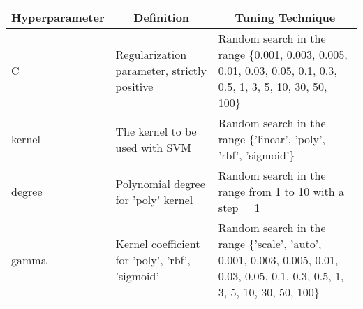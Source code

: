 \begin{table}[H]
\centering
\begin{tabularx}{0.8\textwidth}{l|X|X}
\hline
\textbf{Hyperparameter} & \multicolumn{1}{c|}{\textbf{Definition}}        & \multicolumn{1}{c}{\textbf{Tuning Technique}}                                                                                 \\ \hline
C                       & Regularization parameter, strictly positive     & Random search in the range \{0.001, 0.003, 0.005, 0.01, 0.03, 0.05, 0.1, 0.3, 0.5, 1, 3, 5, 10, 30, 50, 100\}                  \\ \hline
kernel                  & The kernel to be used with SVM                  & Random search in the range \{'linear', 'poly', 'rbf', 'sigmoid'\}                                                              \\ \hline
degree                  & Polynomial degree for 'poly' kernel             & Random search in the range from 1 to 10 with a step = 1                                                                        \\ \hline
gamma                   & Kernel coefficient for 'poly', 'rbf', 'sigmoid' & Random search in the range \{'scale', 'auto', 0.001, 0.003, 0.005, 0.01, 0.03, 0.05, 0.1, 0.3, 0.5, 1, 3, 5, 10, 30, 50, 100\} \\ \hline
\end{tabularx}
\end{table}